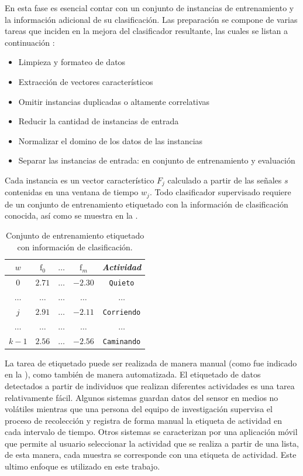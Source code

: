 En esta fase es esencial contar con un conjunto de instancias de entrenamiento
y la información adicional de su clasificación. Las preparación se
compone de varias tareas que inciden en la mejora del clasificador
resultante, las cuales se listan a continuación \cite{Raschka2014}:
\begin{itemize}
\item Limpieza y formateo de datos
\item Extracción de vectores característicos
\item Omitir instancias duplicadas o altamente correlativas
\item Reducir la cantidad de instancias de entrada
\item Normalizar el domino de los datos de las instancias
\item Separar las instancias de entrada: en conjunto de entrenamiento y
evaluación
\end{itemize}
Cada instancia es un vector característico $F_{j}$ calculado a partir
de las señales $s$ contenidas en una ventana de tiempo $w_{j}$.
Todo clasificador supervisado requiere de un conjunto de entrenamiento
etiquetado con la información de clasificación conocida, así como
se muestra en la . 

\begin{table}[!tbph]
\begin{centering}
\begin{tabular}{|c|c|c|c|c|}
\hline 
$w$ & $\mathrm{f}_{0}$ & $\ldots$ & $\mathrm{f}_{m}$ & \emph{Actividad}\tabularnewline
\hline 
\hline 
$0$ & $2.71$ & \texttt{$\ldots$} & \texttt{$-2.30$} & \texttt{\small{}Quieto}\tabularnewline
\hline 
$\ldots$ & $\ldots$ & \texttt{$\ldots$} & \texttt{$\ldots$} & \texttt{$\ldots$}\tabularnewline
\hline 
$j$ & $2.91$ & \texttt{$\ldots$} & \texttt{$-2.11$} & \texttt{\small{}Corriendo}\tabularnewline
\hline 
$\ldots$ & $\ldots$ & \texttt{$\ldots$} & \texttt{$\ldots$} & \texttt{$\ldots$}\tabularnewline
\hline 
$k-1$ & $2.56$ & \texttt{$\ldots$} & \texttt{$-2.56$} & \texttt{\small{}Caminando}\tabularnewline
\hline 
\end{tabular}
\par\end{centering}
\caption[Instancias etiquetadas]{\label{tab4:labeled}Conjunto de entrenamiento etiquetado con información
de clasificación.}
\end{table}

La tarea de etiquetado puede ser realizada de manera manual (como
fue indicado en la ), como también de manera
automatizada. El etiquetado de datos detectados a partir de individuos
que realizan diferentes actividades es una tarea relativamente fácil.
Algunos sistemas guardan datos del sensor en medios no volátiles mientras
que una persona del equipo de investigación supervisa el proceso de
recolección y registra de forma manual la etiqueta de actividad en
cada intervalo de tiempo. Otros sistemas se caracterizan por una aplicación
móvil que permite al usuario seleccionar la actividad que se realiza
a partir de una lista, de esta manera, cada muestra se corresponde
con una etiqueta de actividad. Este ultimo enfoque es utilizado en
este trabajo.

